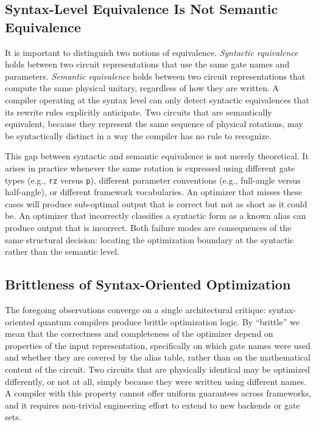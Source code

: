 \documentclass[conference]{IEEEtran}
\begin{document}
\subsection{Syntax-Level Equivalence Is Not Semantic Equivalence}

It is important to distinguish two notions of equivalence. \textit{Syntactic equivalence}
holds between two circuit representations that use the same gate names and parameters.
\textit{Semantic equivalence} holds between two circuit representations that compute the
same physical unitary, regardless of how they are written. A compiler operating at the
syntax level can only detect syntactic equivalences that its rewrite rules explicitly
anticipate. Two circuits that are semantically equivalent, because they represent the
same sequence of physical rotations, may be syntactically distinct in a way the
compiler has no rule to recognize.

This gap between syntactic and semantic equivalence is not merely theoretical. It arises
in practice whenever the same rotation is expressed using different gate types (e.g.,
\texttt{rz} versus \texttt{p}), different parameter conventions (e.g., full-angle versus
half-angle), or different framework vocabularies. An optimizer that misses these cases
will produce sub-optimal output that is correct but not as short as it could be. An
optimizer that incorrectly classifies a syntactic form as a known alias can produce
output that is incorrect. Both failure modes are consequences of the same structural
decision: locating the optimization boundary at the syntactic rather than the semantic
level.

\subsection{Brittleness of Syntax-Oriented Optimization}

The foregoing observations converge on a single architectural critique: syntax-oriented
quantum compilers produce brittle optimization logic. By ``brittle'' we mean that the
correctness and completeness of the optimizer depend on properties of the input
representation, specifically on which gate names were used and whether they are
covered by the alias table, rather than on the mathematical content of the circuit.
Two circuits that are physically identical may be optimized differently, or not at all,
simply because they were written using different names. A compiler with this property
cannot offer uniform guarantees across frameworks, and it requires non-trivial engineering
effort to extend to new backends or gate sets.
\end{document}
